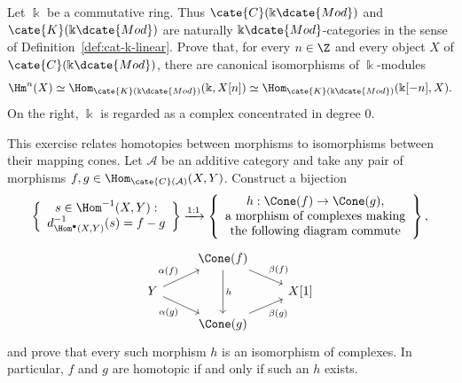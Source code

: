 
\hypertarget{o014.aljabr2.chapter3.exercises}{ }
\begin{Exercises}
	\item Let $\Bbbk$ be a commutative ring. Thus
	$\cate{C}(\Bbbk\dcate{Mod})$ and $\cate{K}(\Bbbk\dcate{Mod})$ are
	naturally $\Bbbk\dcate{Mod}$-categories in the sense of
	Definition~\ref{def:cat-k-linear}. Prove that, for every $n\in\Z$ and
	every object $X$ of $\cate{C}(\Bbbk\dcate{Mod})$, there are canonical
	isomorphisms of $\Bbbk$-modules
	\[
		\Hm^n(X) \simeq
		\Hom_{\cate{K}(\Bbbk\dcate{Mod})}(\Bbbk,X[n])
		\simeq
		\Hom_{\cate{K}(\Bbbk\dcate{Mod})}(\Bbbk[-n],X).
	\]
	On the right, $\Bbbk$ is regarded as a complex concentrated in degree
	$0$.

	\item This exercise relates homotopies between morphisms to isomorphisms
	between their mapping cones. Let $\mathcal{A}$ be an additive category and
	take any pair of morphisms
	$f,g\in\Hom_{\cate{C}(\mathcal{A})}(X,Y)$. Construct a bijection
	\[
	\left\{
	\begin{array}{c}
		s\in\Hom^{-1}(X,Y): \\
		d^{-1}_{\Hom^\bullet(X,Y)}(s)=f-g
	\end{array}
	\right\}
	\xrightarrow{1:1}
	\left\{
	\begin{array}{c}
		h:\Cone(f)\to\Cone(g),\\
		\text{a morphism of complexes making}\\
		\text{the following diagram commute}
	\end{array}
	\right\},
	\]
	\begin{equation*}
	\begin{tikzcd}[row sep=small]
		& \Cone(f) \arrow[dr, "\beta(f)"] \arrow[dd, "h"] & \\
		Y \arrow[ru, "\alpha(f)"] \arrow[rd, "\alpha(g)"'] & & X[1] \\
		& \Cone(g) \arrow[ru, "\beta(g)"'] &
	\end{tikzcd}
	\end{equation*}
	and prove that every such morphism $h$ is an isomorphism of complexes. In
	particular, $f$ and $g$ are homotopic if and only if such an $h$ exists.


\end{Exercises}
